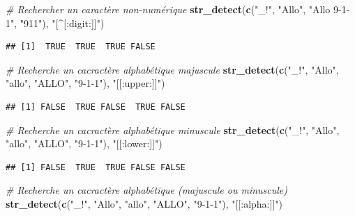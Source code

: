 \documentclass[
  11pt,
]{book}
\newenvironment{Shaded}{\begin{snugshade}}{\end{snugshade}}
\newcommand{\CommentTok}[1]{\textcolor[rgb]{0.56,0.35,0.01}{\textit{#1}}}
\newcommand{\KeywordTok}[1]{\textcolor[rgb]{0.13,0.29,0.53}{\textbf{#1}}}
\newcommand{\NormalTok}[1]{#1}
\newcommand{\StringTok}[1]{\textcolor[rgb]{0.31,0.60,0.02}{#1}}
\numberwithin{equation}{section}
\numberwithin{countremarque}{section}
\begin{document}
\begin{Shaded}
\begin{Highlighting}[]
\CommentTok{\# Rechercher un caractère non{-}numérique}
\KeywordTok{str\_detect}\NormalTok{(}\KeywordTok{c}\NormalTok{(}\StringTok{"\_!"}\NormalTok{, }\StringTok{"Allo"}\NormalTok{, }\StringTok{"Allo 9{-}1{-}1"}\NormalTok{, }\StringTok{"911"}\NormalTok{), }\StringTok{"[\^{}[:digit:]]"}\NormalTok{)}
\end{Highlighting}
\end{Shaded}

\begin{lstlisting}
## [1]  TRUE  TRUE  TRUE FALSE
\end{lstlisting}

\begin{Shaded}
\begin{Highlighting}[]
\CommentTok{\# Recherche un cacractère alphabétique majuscule}
\KeywordTok{str\_detect}\NormalTok{(}\KeywordTok{c}\NormalTok{(}\StringTok{"\_!"}\NormalTok{, }\StringTok{"Allo"}\NormalTok{, }\StringTok{"allo"}\NormalTok{, }\StringTok{"ALLO"}\NormalTok{, }\StringTok{"9{-}1{-}1"}\NormalTok{), }\StringTok{"[[:upper:]]"}\NormalTok{)}
\end{Highlighting}
\end{Shaded}

\begin{lstlisting}
## [1] FALSE  TRUE FALSE  TRUE FALSE
\end{lstlisting}

\begin{Shaded}
\begin{Highlighting}[]
\CommentTok{\# Recherche un cacractère alphabétique minuscule}
\KeywordTok{str\_detect}\NormalTok{(}\KeywordTok{c}\NormalTok{(}\StringTok{"\_!"}\NormalTok{, }\StringTok{"Allo"}\NormalTok{, }\StringTok{"allo"}\NormalTok{, }\StringTok{"ALLO"}\NormalTok{, }\StringTok{"9{-}1{-}1"}\NormalTok{), }\StringTok{"[[:lower:]]"}\NormalTok{)}
\end{Highlighting}
\end{Shaded}

\begin{lstlisting}
## [1] FALSE  TRUE  TRUE FALSE FALSE
\end{lstlisting}

\begin{Shaded}
\begin{Highlighting}[]
\CommentTok{\# Recherche un cacractère alphabétique (majuscule ou minuscule)}
\KeywordTok{str\_detect}\NormalTok{(}\KeywordTok{c}\NormalTok{(}\StringTok{"\_!"}\NormalTok{, }\StringTok{"Allo"}\NormalTok{, }\StringTok{"allo"}\NormalTok{, }\StringTok{"ALLO"}\NormalTok{, }\StringTok{"9{-}1{-}1"}\NormalTok{), }\StringTok{"[[:alpha:]]"}\NormalTok{)}
\end{Highlighting}
\end{Shaded}
\end{document}
